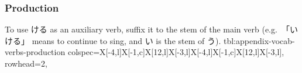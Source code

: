 \documentclass[../nihongo-gakushuu-kyouzai.tex]{subfiles}
\begin{document}
\subsubsection{Production}
To use ける as an auxiliary verb, suffix it to the stem of the main verb (e.g.\ 「いける」 means to continue to sing, and い is the stem of う).
{tbl:appendix-vocab-verbs-production}  %
{
    colspec={X[-4,l]X[-1,c]X[12,l]X[-3,l]X[-4,l]X[-1,c]X[12,l]X[-3,l]},
    rowhead=2,
}  %
\end{document}
